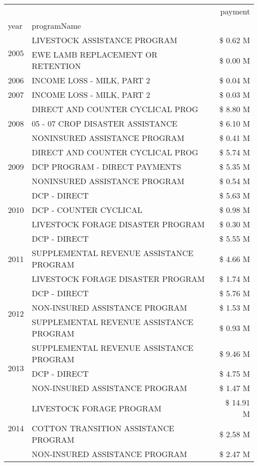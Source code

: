 \begin{tabular}{llr}
\toprule
 &  & payment \\
year & programName &  \\
\midrule
\multirow[t]{2}{*}{2005} & LIVESTOCK ASSISTANCE PROGRAM & \$ 0.62 M \\
 & EWE LAMB REPLACEMENT OR RETENTION & \$ 0.00 M \\
\cline{1-3}
2006 & INCOME LOSS - MILK, PART 2 & \$ 0.04 M \\
\cline{1-3}
2007 & INCOME LOSS - MILK, PART 2 & \$ 0.03 M \\
\cline{1-3}
\multirow[t]{3}{*}{2008} & DIRECT AND COUNTER CYCLICAL PROG & \$ 8.80 M \\
 & 05 - 07 CROP DISASTER ASSISTANCE & \$ 6.10 M \\
 & NONINSURED ASSISTANCE PROGRAM & \$ 0.41 M \\
\cline{1-3}
\multirow[t]{3}{*}{2009} & DIRECT AND COUNTER CYCLICAL PROG & \$ 5.74 M \\
 & DCP PROGRAM - DIRECT PAYMENTS & \$ 5.35 M \\
 & NONINSURED ASSISTANCE PROGRAM & \$ 0.54 M \\
\cline{1-3}
\multirow[t]{3}{*}{2010} & DCP - DIRECT & \$ 5.63 M \\
 & DCP - COUNTER CYCLICAL & \$ 0.98 M \\
 & LIVESTOCK FORAGE DISASTER PROGRAM & \$ 0.30 M \\
\cline{1-3}
\multirow[t]{3}{*}{2011} & DCP - DIRECT & \$ 5.55 M \\
 & SUPPLEMENTAL REVENUE ASSISTANCE PROGRAM & \$ 4.66 M \\
 & LIVESTOCK FORAGE DISASTER PROGRAM & \$ 1.74 M \\
\cline{1-3}
\multirow[t]{3}{*}{2012} & DCP - DIRECT & \$ 5.76 M \\
 & NON-INSURED ASSISTANCE PROGRAM & \$ 1.53 M \\
 & SUPPLEMENTAL REVENUE ASSISTANCE PROGRAM & \$ 0.93 M \\
\cline{1-3}
\multirow[t]{3}{*}{2013} & SUPPLEMENTAL REVENUE ASSISTANCE PROGRAM & \$ 9.46 M \\
 & DCP - DIRECT & \$ 4.75 M \\
 & NON-INSURED ASSISTANCE PROGRAM & \$ 1.47 M \\
\cline{1-3}
\multirow[t]{3}{*}{2014} & LIVESTOCK FORAGE PROGRAM & \$ 14.91 M \\
 & COTTON TRANSITION ASSISTANCE PROGRAM & \$ 2.58 M \\
 & NON-INSURED ASSISTANCE PROGRAM & \$ 2.47 M \\

\end{tabular}
